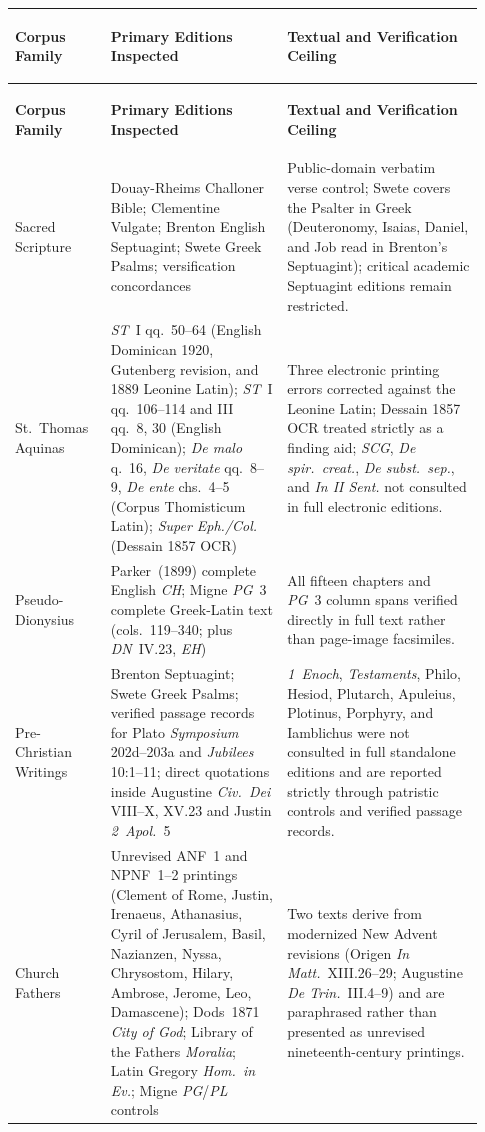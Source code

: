 {\footnotesize
\setlength{\tabcolsep}{3pt}
\renewcommand{\arraystretch}{1.15}
\begin{longtable}{>{\bfseries\raggedright\arraybackslash}p{0.19\linewidth}>{\raggedright\arraybackslash}p{0.35\linewidth}>{\raggedright\arraybackslash}p{0.39\linewidth}}
\toprule
\textbf{Corpus Family} & \textbf{Primary Editions Inspected} & \textbf{Textual and Verification Ceiling} \\
\midrule
\endfirsthead
\toprule
\textbf{Corpus Family} & \textbf{Primary Editions Inspected} & \textbf{Textual and Verification Ceiling} \\
\midrule
\endhead
\bottomrule
\endfoot
Sacred Scripture & Douay-Rheims Challoner Bible; Clementine Vulgate; Brenton English Septuagint; Swete Greek Psalms; versification concordances & Public-domain verbatim verse control; Swete covers the Psalter in Greek (Deuteronomy, Isaias, Daniel, and Job read in Brenton's Septuagint); critical academic Septuagint editions remain restricted. \\
\addlinespace[2pt]
St.~Thomas Aquinas & \emph{ST}~I qq.~50--64 (English Dominican 1920, Gutenberg revision, and 1889 Leonine Latin); \emph{ST}~I qq.~106--114 and III qq.~8, 30 (English Dominican); \emph{De malo} q.~16, \emph{De veritate} qq.~8--9, \emph{De ente} chs.~4--5 (Corpus Thomisticum Latin); \emph{Super Eph./Col.} (Dessain 1857 OCR) & Three electronic printing errors corrected against the Leonine Latin; Dessain 1857 OCR treated strictly as a finding aid; \emph{SCG}, \emph{De spir.\ creat.}, \emph{De subst.\ sep.}, and \emph{In II Sent.} not consulted in full electronic editions. \\
\addlinespace[2pt]
Pseudo-Dionysius & Parker~(1899) complete English \emph{CH}; Migne \emph{PG}~3 complete Greek-Latin text (cols.~119--340; plus \emph{DN}~IV.23, \emph{EH}) & All fifteen chapters and \emph{PG}~3 column spans verified directly in full text rather than page-image facsimiles. \\
\addlinespace[2pt]
Pre-Christian Writings & Brenton Septuagint; Swete Greek Psalms; verified passage records for Plato \emph{Symposium} 202d--203a and \emph{Jubilees} 10:1--11; direct quotations inside Augustine \emph{Civ.\ Dei} VIII--X, XV.23 and Justin \emph{2~Apol.}~5 & \emph{1~Enoch}, \emph{Testaments}, Philo, Hesiod, Plutarch, Apuleius, Plotinus, Porphyry, and Iamblichus were not consulted in full standalone editions and are reported strictly through patristic controls and verified passage records. \\
\addlinespace[2pt]
Church Fathers & Unrevised ANF~1 and NPNF~1--2 printings (Clement of Rome, Justin, Irenaeus, Athanasius, Cyril of Jerusalem, Basil, Nazianzen, Nyssa, Chrysostom, Hilary, Ambrose, Jerome, Leo, Damascene); Dods~1871 \emph{City of God}; Library of the Fathers \emph{Moralia}; Latin Gregory \emph{Hom.\ in Ev.}; Migne \emph{PG}/\emph{PL} controls & Two texts derive from modernized New Advent revisions (Origen \emph{In Matt.}~XIII.26--29; Augustine \emph{De Trin.}~III.4--9) and are paraphrased rather than presented as unrevised nineteenth-century printings. \\

\end{longtable}}
